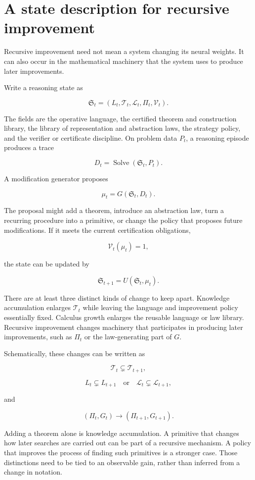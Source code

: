 \documentclass[11pt,oneside,openany]{book}
\begin{document}
\section{A state description for recursive improvement}
Recursive improvement need not mean a system changing its neural weights. It can also occur in the mathematical machinery that the system uses to produce later improvements.

Write a reasoning state as

\[
\mathfrak S_t=(L_t,\mathcal T_t,\mathscr L_t,\Pi_t,\mathcal V_t).
\]

The fields are the operative language, the certified theorem and construction library, the library of representation and abstraction laws, the strategy policy, and the verifier or certificate discipline. On problem data \(P_t\), a reasoning episode produces a trace

\[
D_t=\operatorname{Solve}(\mathfrak S_t,P_t).
\]

A modification generator proposes

\[
\mu_t=G(\mathfrak S_t,D_t).
\]

The proposal might add a theorem, introduce an abstraction law, turn a recurring procedure into a primitive, or change the policy that proposes future modifications. If it meets the current certification obligations,

\[
\mathcal V_t(\mu_t)=1,
\]

the state can be updated by

\[
\mathfrak S_{t+1}=U(\mathfrak S_t,\mu_t).
\]

There are at least three distinct kinds of change to keep apart. Knowledge accumulation enlarges \(\mathcal T_t\) while leaving the language and improvement policy essentially fixed. Calculus growth enlarges the reusable language or law library. Recursive improvement changes machinery that participates in producing later improvements, such as \(\Pi_t\) or the law-generating part of \(G\).

Schematically, these changes can be written as

\[
\mathcal T_t\subsetneq\mathcal T_{t+1},
\]

\[
L_t\subsetneq L_{t+1}\quad\text{or}\quad
\mathscr L_t\subsetneq\mathscr L_{t+1},
\]

and

\[
(\Pi_t,G_t)\longrightarrow(\Pi_{t+1},G_{t+1}).
\]

Adding a theorem alone is knowledge accumulation. A primitive that changes how later searches are carried out can be part of a recursive mechanism. A policy that improves the process of finding such primitives is a stronger case. Those distinctions need to be tied to an observable gain, rather than inferred from a change in notation.
\end{document}
